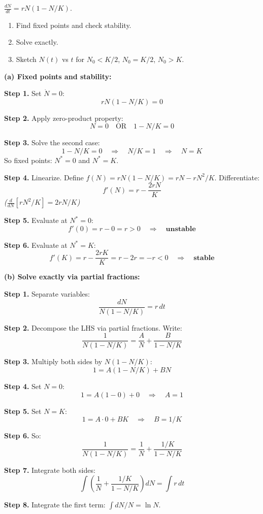 \documentclass[10pt]{article}
\newcommand{\thus}{\quad\Longrightarrow\quad}
\newcommand{\stepwhy}[1]{\textcolor{blue!60!black}{\small\textit{(#1)}}}
\begin{document}
\begin{problem}
$\frac{dN}{dt} = rN(1 - N/K)$.

\begin{enumerate}[label=(\alph*)]
\item Find fixed points and check stability.
\item Solve exactly.
\item Sketch $N(t)$ vs $t$ for $N_0 < K/2$, $N_0 = K/2$, $N_0 > K$.
\end{enumerate}
\end{problem}

\begin{solution}
\textbf{(a) Fixed points and stability:}

\textbf{Step 1.} Set $\dot N = 0$:
\[
rN(1 - N/K) = 0
\]

\textbf{Step 2.} Apply zero-product property:
\[
N = 0 \quad\text{OR}\quad 1 - N/K = 0
\]

\textbf{Step 3.} Solve the second case:
\[
1 - N/K = 0 \thus N/K = 1 \thus N = K
\]
So fixed points: $N^* = 0$ and $N^* = K$.

\textbf{Step 4.} Linearize. Define $f(N) = rN(1-N/K) = rN - rN^2/K$. Differentiate:
\[
f'(N) = r - \frac{2rN}{K}
\]
\stepwhy{$\frac{d}{dN}[rN^2/K] = 2rN/K$}

\textbf{Step 5.} Evaluate at $N^* = 0$:
\[
f'(0) = r - 0 = r > 0 \thus \textbf{unstable}
\]

\textbf{Step 6.} Evaluate at $N^* = K$:
\[
f'(K) = r - \frac{2rK}{K} = r - 2r = -r < 0 \thus \textbf{stable}
\]

\medskip\textbf{(b) Solve exactly via partial fractions:}

\textbf{Step 1.} Separate variables:
\[
\frac{dN}{N(1-N/K)} = r\,dt
\]

\textbf{Step 2.} Decompose the LHS via partial fractions. Write:
\[
\frac{1}{N(1-N/K)} = \frac{A}{N} + \frac{B}{1-N/K}
\]

\textbf{Step 3.} Multiply both sides by $N(1-N/K)$:
\[
1 = A(1-N/K) + BN
\]

\textbf{Step 4.} Set $N=0$:
\[
1 = A(1-0) + 0 \thus A = 1
\]

\textbf{Step 5.} Set $N=K$:
\[
1 = A\cdot 0 + BK \thus B = 1/K
\]

\textbf{Step 6.} So:
\[
\frac{1}{N(1-N/K)} = \frac{1}{N} + \frac{1/K}{1-N/K}
\]

\textbf{Step 7.} Integrate both sides:
\[
\int\left(\frac{1}{N} + \frac{1/K}{1-N/K}\right)dN = \int r\,dt
\]

\textbf{Step 8.} Integrate the first term: $\int dN/N = \ln N$.


\end{solution}
\end{document}
